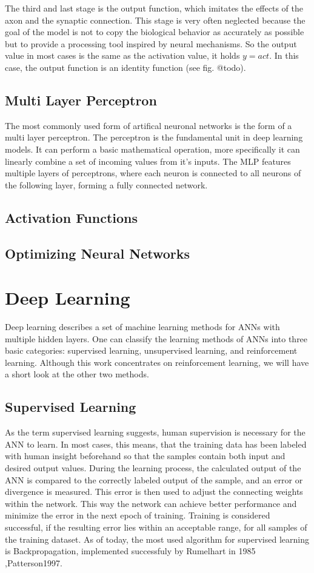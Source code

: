 \documentclass[12pt,a4paper]{article}
\begin{document}
The third and last stage is the output function, which imitates the effects of the axon and the synaptic connection. This stage is very often neglected because the goal of the model is not to copy the biological behavior as accurately as possible but to provide a processing tool inspired by neural mechanisms. So the output value in most cases is the same as the activation value, it holds $y = act$. In this case, the output function is an identity function (see fig. @todo).
\subsection{Multi Layer Perceptron}
The most commonly used form of artifical neuronal networks is the form of a multi layer perceptron. The perceptron is the fundamental unit in deep learning models. It can perform a basic mathematical operation, more specifically it can linearly
combine a set of incoming values from it's inputs. The MLP features multiple layers of perceptrons, where each neuron is connected to all neurons of the following layer, forming a fully connected network.


\subsection{Activation Functions}
\subsection{Optimizing Neural Networks}
\section{Deep Learning}
Deep learning describes a set of machine learning methods for ANNs with multiple hidden layers. One can classify the learning methods of ANNs into three basic categories:  supervised learning, unsupervised learning, and reinforcement learning. Although this work concentrates on reinforcement learning, we will have a short look at the other two methods.
\subsection{Supervised Learning}
As the term supervised learning suggests, human supervision is necessary for the ANN to learn. In most cases, this means, that the training data has been labeled with human insight beforehand so that the samples contain both input and desired output values. During the learning process, the calculated output of the ANN is compared to the correctly labeled output of the sample, and an error or divergence is measured. This error is then used to adjust the connecting weights within the network. This way the network can achieve better performance and minimize the error in the next epoch of training. 
Training is considered successful, if the resulting error lies within an acceptable range, for all samples of the training dataset.
As of today, the most used algorithm for supervised learning is Backpropagation, implemented successfuly by Rumelhart in 1985 \cite{Rumelhart1985},{Patterson1997}.
\end{document}

